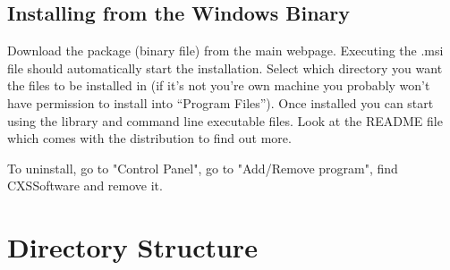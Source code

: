 \documentclass[]{cxs-software}
\begin{document}
\subsection{Installing from the Windows Binary}

Download the package (binary file) from the main webpage. Executing
the .msi file should automatically start the installation. Select
which directory you want the files to be installed in (if it's not
you're own machine you probably won't have permission to install into
``Program Files''). Once installed you can start using the library and
command line executable files. Look at the README file which comes
with the distribution to find out more. 

To uninstall, go to "Control Panel", go to "Add/Remove program", find
CXSSoftware and remove it.


\newpage



\section{Directory Structure}
\end{document}

